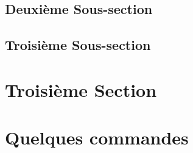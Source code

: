 \documentclass{rapportCS}
\begin{document}
\subsection{Deuxième Sous-section}
\lipsum[1]
\subsection{Troisième Sous-section}
\lipsum[1]

\section{Troisième Section}
\lipsum[1-3]

\newpage
\section{Quelques commandes}
\end{document}
